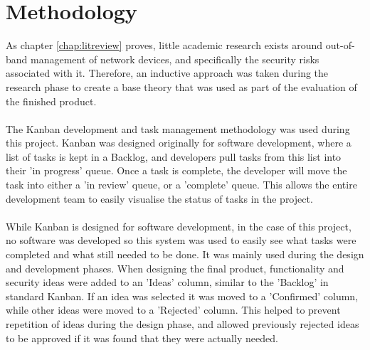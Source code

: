 \section{Methodology}
\label{section:design-methodology}
As chapter \ref{chap:litreview} proves, little academic research exists around out-of-band management of network devices, and specifically the security risks associated with it. Therefore, an inductive approach was taken during the research phase to create a base theory that was used as part of the evaluation of the finished product. \\\\
The Kanban development and task management methodology was used during this project. Kanban was designed originally for software development, where a list of tasks is kept in a Backlog, and developers pull tasks from this list into their 'in progress' queue. Once a task is complete, the developer will move the task into either a 'in review' queue, or a 'complete' queue. This allows the entire development team to easily visualise the status of tasks in the project. \\\\
While Kanban is designed for software development, in the case of this project, no software was developed so this system was used to easily see what tasks were completed and what still needed to be done. It was mainly used during the design and development phases. When designing the final product, functionality and security ideas were added to an 'Ideas' column, similar to the 'Backlog' in standard Kanban. If an idea was selected it was moved to a 'Confirmed' column, while other ideas were moved to a 'Rejected' column. This helped to prevent repetition of ideas during the design phase, and allowed previously rejected ideas to be approved if it was found that they were actually needed.

